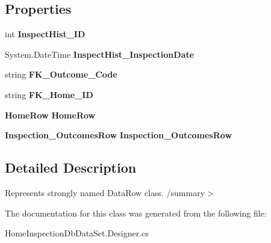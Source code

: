 \subsection*{Properties}
\begin{DoxyCompactItemize}
\item 
\mbox{\label{class_a_f_h___scheduler_1_1_home_inspection_db_data_set_1_1_inspection___history_row_a035d1ca15e12e6ce98ed7f43107bffda}} 
int {\bfseries Inspect\+Hist\+\_\+\+ID}\hspace{0.3cm}{\ttfamily  [get, set]}
\item 
\mbox{\label{class_a_f_h___scheduler_1_1_home_inspection_db_data_set_1_1_inspection___history_row_a7e0ab6bab4fd35d4111c96cfd78edc40}} 
System.\+Date\+Time {\bfseries Inspect\+Hist\+\_\+\+Inspection\+Date}\hspace{0.3cm}{\ttfamily  [get, set]}
\item 
\mbox{\label{class_a_f_h___scheduler_1_1_home_inspection_db_data_set_1_1_inspection___history_row_a405e2ed811692188bfc468df940cc135}} 
string {\bfseries F\+K\+\_\+\+Outcome\+\_\+\+Code}\hspace{0.3cm}{\ttfamily  [get, set]}
\item 
\mbox{\label{class_a_f_h___scheduler_1_1_home_inspection_db_data_set_1_1_inspection___history_row_adf6f371d3b0d415798ab143477190edb}} 
string {\bfseries F\+K\+\_\+\+Home\+\_\+\+ID}\hspace{0.3cm}{\ttfamily  [get, set]}
\item 
\mbox{\label{class_a_f_h___scheduler_1_1_home_inspection_db_data_set_1_1_inspection___history_row_a91dcec20482d7cc56646f66d46e0cbf0}} 
\textbf{ Home\+Row} {\bfseries Home\+Row}\hspace{0.3cm}{\ttfamily  [get, set]}
\item 
\mbox{\label{class_a_f_h___scheduler_1_1_home_inspection_db_data_set_1_1_inspection___history_row_ac124d0b2ebd497cbd092c6479d3a5a98}} 
\textbf{ Inspection\+\_\+\+Outcomes\+Row} {\bfseries Inspection\+\_\+\+Outcomes\+Row}\hspace{0.3cm}{\ttfamily  [get, set]}
\end{DoxyCompactItemize}


\subsection{Detailed Description}
Represents strongly named Data\+Row class. /summary$>$ 

The documentation for this class was generated from the following file\+:\begin{DoxyCompactItemize}
\item 
Home\+Inspection\+Db\+Data\+Set.\+Designer.\+cs\end{DoxyCompactItemize}
